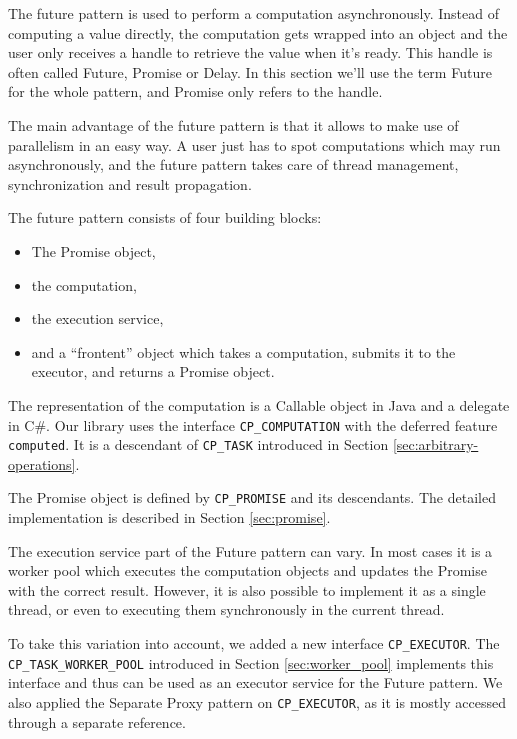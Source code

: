 \documentclass[a4paper,10pt]{article}
\begin{document}
The future pattern is used to perform a computation asynchronously.
Instead of computing a value directly, the computation gets wrapped into an object and the user only receives a handle to retrieve the value when it's ready.
This handle is often called Future, Promise or Delay.
In this section we'll use the term Future for the whole pattern, and Promise only refers to the handle.

The main advantage of the future pattern is that it allows to make use of parallelism in an easy way.
A user just has to spot computations which may run asynchronously, and the future pattern takes care of thread management, synchronization and result propagation.

The future pattern consists of four building blocks:
\begin{itemize}
 \item The Promise object,
 \item the computation,
 \item the execution service,
 \item and a ``frontent'' object which takes a computation, submits it to the executor, and returns a Promise object.
\end{itemize}

The representation of the computation is a Callable object in Java and a delegate in C\#.
Our library uses the interface \lstinline!CP_COMPUTATION! with the deferred feature \lstinline!computed!.
It is a descendant of \lstinline!CP_TASK! introduced in Section \ref{sec:arbitrary-operations}.

The Promise object is defined by \lstinline!CP_PROMISE! and its descendants.
The detailed implementation is described in Section \ref{sec:promise}.

The execution service part of the Future pattern can vary.
In most cases it is a worker pool which executes the computation objects and updates the Promise with the correct result.
However, it is also possible to implement it as a single thread, or even to executing them synchronously in the current thread.

To take this variation into account, we added a new interface \lstinline!CP_EXECUTOR!.
The \lstinline!CP_TASK_WORKER_POOL! introduced in Section \ref{sec:worker_pool} implements this interface and thus can be used as an executor service for the Future pattern.
We also applied the Separate Proxy pattern on \lstinline!CP_EXECUTOR!, as it is mostly accessed through a separate reference.

\end{document}
